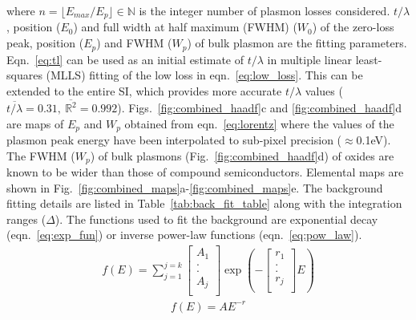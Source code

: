 \documentclass[%
aip,
rsi,%
 amsmath,amssymb,%
 reprint,%
]{revtex4-1}
\begin{document}
where $n = \lfloor E_{max}/E_p \rfloor \in \mathbb{N}$ is the integer number of plasmon losses considered. $t/\lambda$, position ($E_0$) and full width at half maximum (FWHM) ($W_0$) of the zero-loss peak, position ($E_p$) and FWHM ($W_p$) of bulk plasmon are the fitting parameters. Eqn.~\ref{eq:tl} can be used as an initial estimate of $t/\lambda$ in multiple linear least-squares (MLLS) fitting of the low loss in eqn.~\ref{eq:low_loss}. This can be extended to the entire SI, which provides more accurate $t/\lambda$ values ($\overline{t/\lambda}=0.31,~\overline{\mathbb{R}^2}=0.992$). Figs.~\ref{fig:combined_haadf}c and \ref{fig:combined_haadf}d are maps of $E_p$ and $W_p$ obtained from eqn.~\ref{eq:lorentz} where the values of the plasmon peak energy have been interpolated to sub-pixel precision ($\approx$0.1eV). The FWHM  ($W_p$) of bulk plasmons (Fig.~\ref{fig:combined_haadf}d) of oxides are known to be wider than those of compound semiconductors. Elemental maps are shown in Fig.~\ref{fig:combined_maps}a-\ref{fig:combined_maps}e. The background fitting details are listed in Table~\ref{tab:back_fit_table} along with the integration ranges ($\Delta$). The functions used to fit the background are exponential decay (eqn.~\ref{eq:exp_fun}) or inverse power-law functions (eqn.~\ref{eq:pow_law}).
\begin{eqnarray}
	f(E) =
    \sum^{j=k}_{j=1}
    \left[
    \begin{array}{c}
    	A_1 	\\
        . 		\\
        . 		\\
        A_j 	\\
    \end{array}
    \right]
    \operatorname{exp}\left(-\left[
    \begin{array}{c}
    	r_1 	\\
        . 		\\
        . 		\\
        r_j 	\\
    \end{array}
    \right]E\right)
    \label{eq:exp_fun}
\end{eqnarray}
\begin{eqnarray}
	f(E) = AE^{-r}
    \label{eq:pow_law}
\end{eqnarray}
\end{document}
